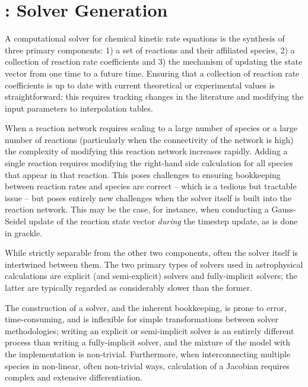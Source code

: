 \section{\dengo{}: Solver Generation}

A computational solver for chemical kinetic rate equations is the synthesis of
three primary components: 1) a set of reactions and their affiliated species,
2) a collection of reaction rate coefficients and 3) the mechanism of updating
the state vector from one time to a future time.  Ensuring that a collection of
reaction rate coefficients is up to date with current theoretical or
experimental values is straightforward; this requires tracking changes in the
literature and modifying the input parameters to interpolation tables.

When a reaction network requires scaling to a large number of species
or a large number of reactions (particularly when the connectivity of the
network is high) the complexity of modifying this reaction network increases
rapidly.  Adding a single reaction requires modifying the right-hand side
calculation for all species that appear in that reaction.  This poses
challenges to ensuring bookkeeping between reaction rates and species are
correct -- which is a tedious but tractable issue -- but poses entirely new
challenges when the solver itself is built into the reaction network.  This may
be the case, for instance, when conducting a Gauss-Seidel update of the
reaction state vector \textit{during} the timestep update, as is done in
grackle.

While strictly separable from the other two components, often the solver itself
is intertwined between them.  The two primary types of solvers used in
astrophysical calculations are explicit (and semi-explicit) solvers  and
fully-implicit solvers; the latter are typically regarded as considerably
slower than the former.

The construction of a solver, and the inherent
bookkeeping, is prone to error, time-consuming, and is inflexible for simple
transformations between solver methodologies; writing an explicit or
semi-implicit solver is an entirely different process than writing a
fully-implicit solver, and the mixture of the model with the implementation is
non-trivial.  Furthermore, when interconnecting multiple species in non-linear,
often non-trivial ways, calculation of a Jacobian requires complex and
extensive differentiation.

